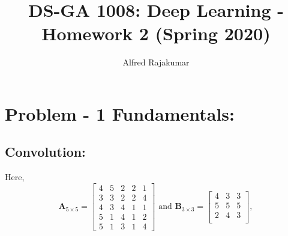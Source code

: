 \documentclass{article}
\title{DS-GA 1008: Deep Learning - Homework 2 (Spring 2020)}
\author{Alfred Rajakumar}
\begin{document}
\maketitle

\section{Problem - 1 Fundamentals:}
\subsection{Convolution:}

Here, 
\begin{equation}
    \textbf{A}_{5\times 5} = \begin{bmatrix}
        4&5&2&2&1\\
        3&3&2&2&4\\
        4&3&4&1&1\\
        5&1&4&1&2\\
        5&1&3&1&4
    \end{bmatrix}\text{ and }
    \textbf{B}_{3\times 3} = \begin{bmatrix}
        4&3&3\\
        5&5&5\\
        2&4&3\\
    \end{bmatrix},
\end{equation}
\end{document}

